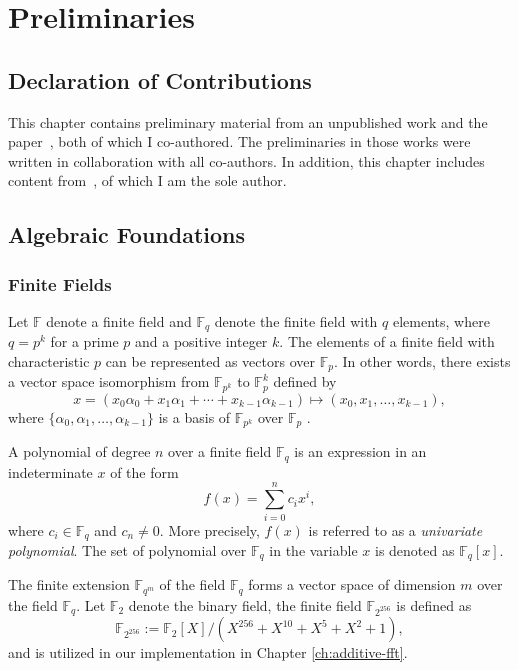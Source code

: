 \chapter{Preliminaries} \label{ch:preliminaries}

\section*{Declaration of Contributions}
This chapter contains preliminary material from an unpublished work and the paper~\cite{Badakhshan2025Ursa}, both of which I co-authored. The preliminaries in those works were written in collaboration with all co-authors. In addition, this chapter includes content from~\cite{Badakhshan2024Zupply}, of which I am the sole author.


\section{Algebraic Foundations}

\subsection{Finite Fields}
Let $\mathbb{F}$ denote a finite field and $\mathbb{F}_q$ denote the finite field with $q$ elements, where $q=p^k$ for a prime $p$ and a positive integer $k$. The elements of a finite field with characteristic $p$ can be represented as vectors over $\mathbb{F}_p$. In other words, there exists a vector space isomorphism from $\mathbb{F}_{p^k}$ to $\mathbb{F}_p^k$ defined by $$x=(x_0\alpha_0+x_1\alpha_1+ \cdots +x_{k-1}\alpha_{k-1}) \mapsto (x_0,x_1, \ldots,x_{k-1}),$$ where $\{\alpha_{0},\alpha_{1},\ldots,\alpha_{k-1}\}$ is a basis of $\mathbb{F}_{p^k}$ over $\mathbb{F}_p$ \cite{samanta2023thesis}.

A polynomial of degree $n$ over a finite field $\mathbb{F}_{q}$ is an expression in an indeterminate $x$ of the form
\[
f(x) = \sum_{i=0}^{n} c_i x^i,
\]
where $c_i \in \mathbb{F}_{q}$ and $c_n \neq 0$. More precisely, $f(x)$ is referred to as a \textit{univariate polynomial}. The set of polynomial over $\mathbb{F}_{q}$ in the variable $x$ is denoted as $\mathbb{F}_{q}[x]$. 

The finite extension $\mathbb{F}_{q^m}$ of the field $\mathbb{F}_{q}$ forms a vector space of dimension $m$ over the field $\mathbb{F}_{q}$. Let $\mathbb{F}_2$ denote the binary field, the  finite field $\mathbb{F}_{2^{256}}$ is defined as
\begin{equation}\label{eq:F_2_256}
	\mathbb{F}_{2^{256}} := \mathbb{F}_{2}[X]/(X^{256} + X^{10} + X^5 + X^2 + 1),
\end{equation}
and is utilized in our implementation in Chapter \ref{ch:additive-fft}.

